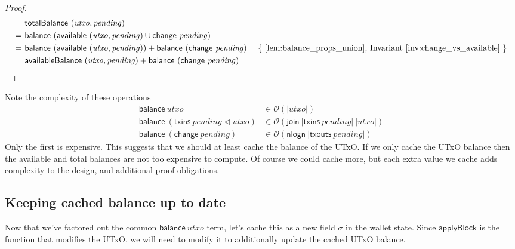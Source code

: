 \documentclass{article}
\newcommand{\order}[1]{\mathcal{O}\left(#1\right)}
\newcommand{\restrictdom}{\lhd}
\theoremstyle{definition}{
  \newtheorem{lemma}{Lemma}[section] %
  \newtheorem{definition}[lemma]{Definition}
}
\theoremstyle{theorem}{
  \newtheorem{invariant}[lemma]{Invariant}
  \newtheorem{proofobligation}[lemma]{Proof Obligation}
}
\numberwithin{equation}{lemma}
\begin{document}
\begin{proof}
\begin{align*}
   & ~ \mathsf{totalBalance} ~ (\mathit{utxo}, \mathit{pending}) \\
 = & ~ \mathsf{balance} ~ (\mathsf{available} ~ (\mathit{utxo}, \mathit{pending}) \cup \mathsf{change} ~ \mathit{pending}) \\
 = & ~ \mathsf{balance} ~ (\mathsf{available} ~ (\mathit{utxo}, \mathit{pending}))
     + \mathsf{balance} ~ (\mathsf{change} ~ \mathit{pending})
   & \text{ \{ \cref{lem:balance_props_union}, Invariant~\ref{inv:change_vs_available} \}} \\
=  & ~ \mathsf{availableBalance} ~ (\mathit{utxo}, \mathit{pending}) + \mathsf{balance} ~ (\mathsf{change} ~ \mathit{pending})
\end{align*}
\end{proof}

Note the complexity of these operations
%
\begin{equation*}
\begin{split}
\mathsf{balance} ~ utxo & \in \order{|utxo|} \\
\mathsf{balance} ~ (\mathsf{txins} ~ \mathit{pending} \restrictdom utxo) & \in \order{\mathsf{join} ~ |\mathsf{txins}~ \mathit{pending}| ~ |utxo|} \\
\mathsf{balance} ~ (\mathsf{change} ~ \mathit{pending}) & \in \order{\mathsf{nlogn} ~ |\mathsf{txouts}~ \mathit{pending}|}
\end{split}
\end{equation*}
%
Only the first is expensive. This suggests that we should at least cache the
balance of the UTxO. If we only cache the UTxO balance then the available and total
balances are not too expensive to compute. Of course we could cache more, but
each extra value we cache adds complexity to the design, and additional proof
obligations.

\subsection{Keeping cached balance up to date}
\label{sec:applyBlock_incr}

Now that we've factored out the common $\mathsf{balance} ~ \mathit{utxo}$
term, let's cache this as a new field $\sigma$ in the wallet state. Since
$\mathsf{applyBlock}$ is the function that modifies the UTxO, we will
need to modify it to additionally update the cached UTxO balance.
\end{document}
